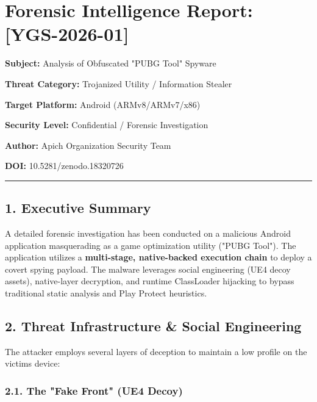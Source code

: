 \documentclass[
]{article}
\author{}
\date{}
\begin{document}
\section{\texorpdfstring{\textbf{Forensic Intelligence Report:
{[}YGS-2026-01{]}}}{Forensic Intelligence Report: {[}YGS-2026-01{]}}}\label{forensic-intelligence-report-ygs-2026-01}

\textbf{Subject:} Analysis of Obfuscated "PUBG Tool" Spyware

\textbf{Threat Category:} Trojanized Utility / Information Stealer

\textbf{Target Platform:} Android (ARMv8/ARMv7/x86)

\textbf{Security Level:} Confidential / Forensic Investigation

\textbf{Author:} Apich Organization Security Team

\textbf{DOI:} 10.5281/zenodo.18320726

\begin{center}\rule{0.5\linewidth}{0.5pt}\end{center}

\subsection{\texorpdfstring{\textbf{1. Executive
Summary}}{1. Executive Summary}}\label{1-executive-summary}

A detailed forensic investigation has been conducted on a malicious
Android application masquerading as a game optimization utility ("PUBG
Tool"). The application utilizes a \textbf{multi-stage, native-backed
execution chain} to deploy a covert spying payload. The malware
leverages social engineering (UE4 decoy assets), native-layer
decryption, and runtime ClassLoader hijacking to bypass traditional
static analysis and Play Protect heuristics.

\subsection{\texorpdfstring{\textbf{2. Threat Infrastructure \& Social
Engineering}}{2. Threat Infrastructure \& Social Engineering}}\label{2-threat-infrastructure--social-engineering}

The attacker employs several layers of deception to maintain a low
profile on the victim\textquotesingle s device:

\subsubsection{\texorpdfstring{\textbf{2.1. The "Fake Front" (UE4
Decoy)}}{2.1. The "Fake Front" (UE4 Decoy)}}\label{21-the-fake-front-ue4-decoy}
\end{document}
